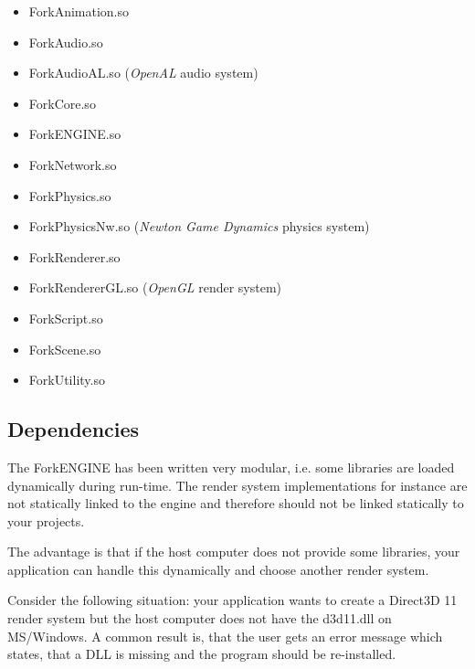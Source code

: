 \documentclass{article}
\begin{document}
\begin{itemize}

\item
ForkAnimation.so

\item
ForkAudio.so

\item
ForkAudioAL.so (\textit{OpenAL} audio system)

\item
ForkCore.so

\item
ForkENGINE.so

\item
ForkNetwork.so

\item
ForkPhysics.so

\item
ForkPhysicsNw.so (\textit{Newton Game Dynamics} physics system)

\item
ForkRenderer.so

\item
ForkRendererGL.so (\textit{OpenGL} render system)

\item
ForkScript.so

\item
ForkScene.so

\item
ForkUtility.so

\end{itemize}

\subsection{Dependencies}
The ForkENGINE has been written very modular, i.e. some libraries are loaded dynamically during run-time.
The render system implementations for instance are not statically linked to the engine and therefore
should not be linked statically to your projects.

The advantage is that if the host computer does not provide some libraries,
your application can handle this dynamically and choose another render system.

Consider the following situation: your application wants to create a Direct3D 11 render system
but the host computer does not have the d3d11.dll on MS/Windows.
A common result is, that the user gets an error message which states,
that a DLL is missing and the program should be re-installed.
\end{document}

